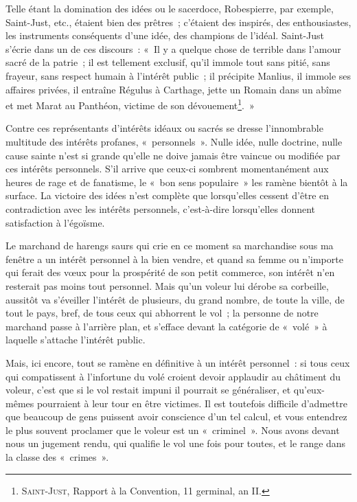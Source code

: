 \documentclass[french,twoside]{book} %
\begin{document}
Telle étant la domination des idées ou le sacerdoce, Robespierre, par exemple, Saint-Just, etc., étaient bien des prêtres ; c’étaient des inspirés, des enthousiastes, les instruments conséquents d’une idée, des champions de l’idéal. Saint-Just s’écrie dans un de ces discours : « Il y a quelque chose de terrible dans l’amour sacré de la patrie ; il est tellement exclusif, qu’il immole tout sans pitié, sans frayeur, sans respect humain à l’intérêt public ; il précipite Manlius, il immole ses affaires privées, il entraîne Régulus à Carthage, jette un Romain dans un abîme et met Marat au Panthéon, victime de son dévouement\footnote{ \noindent S{\scshape aint}-J{\scshape ust}, Rapport à la Convention, 11 germinal, an II.
 }. »\par
 Contre ces représentants d’intérêts idéaux ou sacrés se dresse l’innombrable multitude des intérêts profanes, « personnels ». Nulle idée, nulle doctrine, nulle cause sainte n’est si grande qu’elle ne doive jamais être vaincue ou modifiée par ces intérêts personnels. S’il arrive que ceux-ci sombrent momentanément aux heures de rage et de fanatisme, le « bon sens populaire » les ramène bientôt à la surface. La victoire des idées n’est complète que lorsqu’elles cessent d’être en contradiction avec les intérêts personnels, c’est-à-dire lorsqu’elles donnent satisfaction à l’égoïsme.\par
Le marchand de harengs saurs qui crie en ce moment sa marchandise sous ma fenêtre a un intérêt personnel à la bien vendre, et quand sa femme ou n’importe qui ferait des vœux pour la prospérité de son petit commerce, son intérêt n’en resterait pas moins tout personnel. Mais qu’un voleur lui dérobe sa corbeille, aussitôt va s’éveiller l’intérêt de plusieurs, du grand nombre, de toute la ville, de tout le pays, bref, de tous ceux qui abhorrent le vol ; la personne de notre marchand passe à l’arrière plan, et s’efface devant la catégorie de « volé » à laquelle s’attache l’intérêt public.\par
Mais, ici encore, tout se ramène en définitive à un intérêt personnel : si tous ceux qui compatissent à l’infortune du volé croient devoir applaudir au châtiment du voleur, c’est que si le vol restait impuni il pourrait se généraliser, et qu’eux-mêmes pourraient à leur tour en être victimes. Il est toutefois difficile d’admettre que beaucoup de gens puissent avoir conscience d’un tel calcul, et vous entendrez le plus souvent proclamer que le voleur est un « criminel ». Nous avons devant nous un jugement rendu, qui qualifie le vol une fois pour toutes, et le range dans la classe des « crimes ».\par
\end{document}
